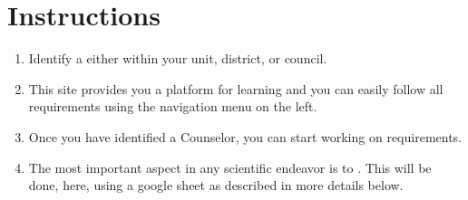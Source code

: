 \documentclass[letterpaper,10pt,english,openany,oneside]{sphinxmanual}
\begin{document}
\section{Instructions}
\label{\detokenize{introduction:instructions}}\begin{enumerate}
%
\item {} 
Identify a  either within your unit, district, or council.

\item {} 
This site provides you a platform for learning and you can easily follow all requirements using the navigation menu on the left.

\item {} 
Once you have identified a Counselor, you can start working on requirements.

\item {} 
The most important aspect in any scientific endeavor is to . This will be done, here, using a google sheet as described in more details below.

\end{enumerate}
\end{document}
